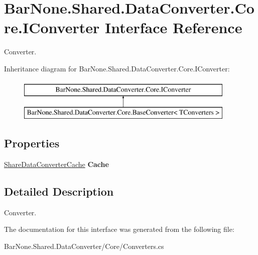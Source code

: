 \hypertarget{interface_bar_none_1_1_shared_1_1_data_converter_1_1_core_1_1_i_converter}{}\section{Bar\+None.\+Shared.\+Data\+Converter.\+Core.\+I\+Converter Interface Reference}
\label{interface_bar_none_1_1_shared_1_1_data_converter_1_1_core_1_1_i_converter}


Converter.  


Inheritance diagram for Bar\+None.\+Shared.\+Data\+Converter.\+Core.\+I\+Converter\+:\begin{figure}[H]
\begin{center}
\leavevmode
\includegraphics[height=2.000000cm]{interface_bar_none_1_1_shared_1_1_data_converter_1_1_core_1_1_i_converter}
\end{center}
\end{figure}
\subsection*{Properties}
\begin{DoxyCompactItemize}
\item 
\mbox{\label{interface_bar_none_1_1_shared_1_1_data_converter_1_1_core_1_1_i_converter_a66737f5180c216dd77ac6b7bda25611b}} 
\mbox{\hyperlink{class_bar_none_1_1_shared_1_1_data_converter_1_1_core_1_1_share_data_converter_cache}{Share\+Data\+Converter\+Cache}} {\bfseries Cache}
\end{DoxyCompactItemize}


\subsection{Detailed Description}
Converter. 



The documentation for this interface was generated from the following file\+:\begin{DoxyCompactItemize}
\item 
Bar\+None.\+Shared.\+Data\+Converter/\+Core/Converters.\+cs\end{DoxyCompactItemize}
